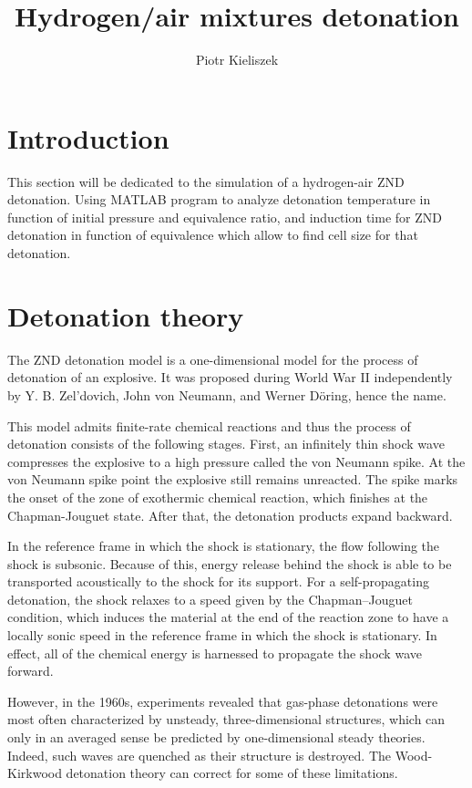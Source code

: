 \documentclass[a4paper]{article}
\title{Hydrogen/air mixtures detonation}
\author{Piotr Kieliszek}
\begin{document}
\maketitle



\section{Introduction}

This section will be dedicated to the simulation of a hydrogen-air ZND detonation. Using MATLAB program to analyze detonation temperature in function of initial pressure and equivalence ratio, and induction time for ZND detonation in function of equivalence which allow to find cell size for that detonation.

\section{Detonation theory}
The ZND detonation model is a one-dimensional model for the process of detonation of an explosive. It was proposed during World War II independently by Y. B. Zel'dovich, John von Neumann, and Werner Döring, hence the name.

This model admits finite-rate chemical reactions and thus the process of detonation consists of the following stages. First, an infinitely thin shock wave compresses the explosive to a high pressure called the von Neumann spike. At the von Neumann spike point the explosive still remains unreacted. The spike marks the onset of the zone of exothermic chemical reaction, which finishes at the Chapman-Jouguet state. After that, the detonation products expand backward.

In the reference frame in which the shock is stationary, the flow following the shock is subsonic. Because of this, energy release behind the shock is able to be transported acoustically to the shock for its support. For a self-propagating detonation, the shock relaxes to a speed given by the Chapman–Jouguet condition, which induces the material at the end of the reaction zone to have a locally sonic speed in the reference frame in which the shock is stationary. In effect, all of the chemical energy is harnessed to propagate the shock wave forward.

However, in the 1960s, experiments revealed that gas-phase detonations were most often characterized by unsteady, three-dimensional structures, which can only in an averaged sense be predicted by one-dimensional steady theories. Indeed, such waves are quenched as their structure is destroyed. The Wood-Kirkwood detonation theory can correct for some of these limitations.
\end{document}
